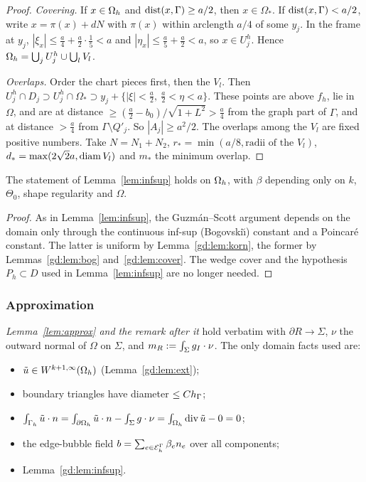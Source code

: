 \begin{proof}
\emph{Covering.} If $x\in\Omega_h$ and $\operatorname{dist}(x,\Gamma)\ge a/2$, then $x\in\Omega_\ast$. If $\operatorname{dist}(x,\Gamma)<a/2$, write $x=\pi(x)+dN$ with $\pi(x)$ within arclength $a/4$ of some $y_j$. In the frame at $y_j$, $|\xi_x|\le\frac a4+\frac a2\cdot\frac15<a$ and $|\eta_x|\le\frac a5+\frac a2<a$, so $x\in U_j^h$. Hence $\Omega_h=\bigcup_jU_j^h\cup\bigcup_lV_l$.

\emph{Overlaps.} Order the chart pieces first, then the $V_l$. Then $U_j^h\cap D_j\supset U_j^h\cap\Omega_\ast\supset y_j+\{|\xi|<\frac a2,\ \frac a2<\eta<a\}$. These points are above $f_h$, lie in $\Omega$, and are at distance $\ge(\frac a2-b_0)/\sqrt{1+L^2}>\frac a4$ from the graph part of $\Gamma$, and at distance $>\frac a4$ from $\Gamma\setminus Q'_j$. So $|A_j|\ge a^2/2$. The overlaps among the $V_l$ are fixed positive numbers. Take $N=N_1+N_2$, $r_\ast=\min(a/8,\text{radii of the }V_l)$, $d_\ast=\max(2\sqrt2a,\operatorname{diam} V_l)$ and $m_\ast$ the minimum overlap.
\end{proof}

\begin{lemma}\label{gd:lem:infsup}
The statement of Lemma~\ref{lem:infsup} holds on $\Omega_h$, with $\beta$ depending only on $k$, $\Theta_0$, shape regularity and $\Omega$.
\end{lemma}

\begin{proof}
As in Lemma~\ref{lem:infsup}, the Guzm\'an--Scott argument \cite{GuzmanScott2019} depends on the domain only through the continuous inf-sup (Bogovski\u{\i}) constant and a Poincar\'e constant. The latter is uniform by Lemma~\ref{gd:lem:korn}, the former by Lemmas~\ref{gd:lem:bog} and~\ref{gd:lem:cover}. The wedge cover and the hypothesis $P_h\subset D$ used in Lemma~\ref{lem:infsup} are no longer needed.
\end{proof}

\subsubsection{Approximation}
\emph{Lemma~\ref{lem:approx} and the remark after it} hold verbatim with $\partial R\to\Sigma$, $\nu$ the outward normal of $\Omega$ on $\Sigma$, and $m_R:=\int_\Sigma g_I\cdot\nu$. The only domain facts used are:
\begin{itemize}
\item $\tilde u\in W^{k+1,\infty}(\Omega_h)$ (Lemma~\ref{gd:lem:ext});
\item boundary triangles have diameter $\le Ch_\Gamma$;
\item $\int_{\Gamma_h}\tilde u\cdot n=\int_{\partial\Omega_h}\tilde u\cdot n-\int_\Sigma g\cdot\nu=\int_{\Omega_h}\operatorname{div}\tilde u-0=0$;
\item the edge-bubble field $b=\sum_{e\in\mathcal E_h^\Gamma}\beta_en_e$ over all components;
\item Lemma~\ref{gd:lem:infsup}.
\end{itemize}

